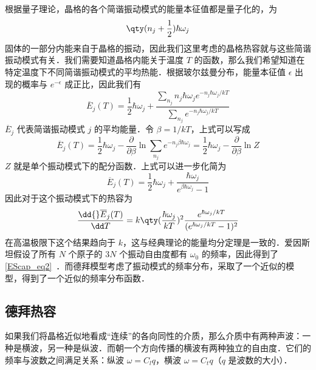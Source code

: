 

根据量子理论，晶格的各个简谐振动模式的能量本征值都是量子化的，为
\begin{equation}
\qty(n_j+\frac{1}{2})\hbar \omega_j
\end{equation}
固体的一部分内能来自于晶格的振动，因此我们这里考虑的晶格热容就与这些简谐振动模式有关．我们需要知道晶格内能关于温度 $T$ 的函数，那么我们希望知道在特定温度下不同简谐振动模式的平均热能．根据玻尔兹曼分布，能量本征值 $\epsilon$ 出现的概率与 $e^{-\epsilon}$ 成正比，因此我们有
\begin{equation}
\overline E_j(T)=\frac{1}{2}\hbar \omega_j + \frac{\sum_{n_j} n_j\hbar \omega_j e^{-n_j \hbar \omega_j / kT}}{\sum_{n_j} e^{-n_j \hbar \omega_j / kT}}
\end{equation}
$\overline E_j$ 代表简谐振动模式 $j$ 的平均能量．令 $\beta=1/kT$，上式可以写成
\begin{equation}
\overline E_j(T)=\frac{1}{2}\hbar \omega_j - \frac{\partial}{\partial \beta} \ln \sum_{n_j} e^{-n_j\beta\hbar\omega_j}=\frac{1}{2}\hbar \omega_j - \frac{\partial}{\partial \beta} \ln Z
\end{equation}
$Z$ 就是单个振动模式下的配分函数．上式可以进一步化简为
\begin{equation}
\overline E_j(T)=\frac{1}{2}\hbar \omega_j + \frac{\hbar \omega_j}{e^{\beta\hbar\omega_j}-1}
\end{equation}
因此对于这个振动模式下的热容为
\begin{equation}
\frac{\dd{} \overline E_j(T)}{\dd T}=k \qty(\frac{\hbar\omega_j}{kT})^2\frac{e^{\hbar \omega_j/kT}}{(e^{\hbar\omega_j/kT}-1)^2}
\end{equation}
在高温极限下这个结果趋向于 $k$，这与经典理论的能量均分定理是一致的．爱因斯坦假设了所有 $N$ 个原子的 $3N$ 个振动自由度都有 $\omega_0$ 的频率，因此得到了\autoref{EScap_eq2}~．而德拜模型考虑了振动模式的频率分布，采取了一个近似的模型，得到了一个近似的频率分布函数．

\subsection{德拜热容}
如果我们将晶格近似地看成“连续”的各向同性的介质，那么介质中有两种声波：一种是横波，另一种是纵波．而朝一个方向传播的横波有两种独立的自由度．它们的频率与波数之间满足关系：纵波 $\omega=C_l q$，横波 $\omega=C_t q$（$q$ 是波数的大小）．

